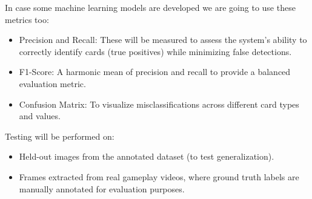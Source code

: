 \documentclass{article}
\begin{document}
In case some machine learning models are developed we are going to use these metrics too: 

\begin{itemize}
	\item Precision and Recall: These will be measured to assess the system’s ability to correctly identify cards (true positives) while minimizing false detections.
	\item F1-Score: A harmonic mean of precision and recall to provide a balanced evaluation metric.
	\item Confusion Matrix: To visualize misclassifications across different card types and values.
\end{itemize}

Testing will be performed on:

\begin{itemize}
	\item Held-out images from the annotated dataset (to test generalization).
	\item Frames extracted from real gameplay videos, where ground truth labels are manually annotated for evaluation purposes.
\end{itemize}

%
%
%

\nocite{*}



\end{document}
